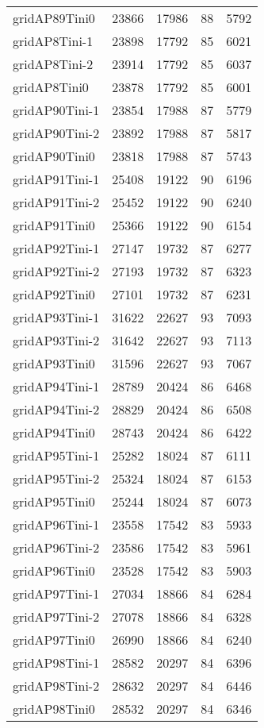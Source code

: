 \begin{tabular}{lrrrr}
gridAP89Tini0 & 23866 & 17986 & 88 & 5792 \\
gridAP8Tini-1 & 23898 & 17792 & 85 & 6021 \\
gridAP8Tini-2 & 23914 & 17792 & 85 & 6037 \\
gridAP8Tini0 & 23878 & 17792 & 85 & 6001 \\
gridAP90Tini-1 & 23854 & 17988 & 87 & 5779 \\
gridAP90Tini-2 & 23892 & 17988 & 87 & 5817 \\
gridAP90Tini0 & 23818 & 17988 & 87 & 5743 \\
gridAP91Tini-1 & 25408 & 19122 & 90 & 6196 \\
gridAP91Tini-2 & 25452 & 19122 & 90 & 6240 \\
gridAP91Tini0 & 25366 & 19122 & 90 & 6154 \\
gridAP92Tini-1 & 27147 & 19732 & 87 & 6277 \\
gridAP92Tini-2 & 27193 & 19732 & 87 & 6323 \\
gridAP92Tini0 & 27101 & 19732 & 87 & 6231 \\
gridAP93Tini-1 & 31622 & 22627 & 93 & 7093 \\
gridAP93Tini-2 & 31642 & 22627 & 93 & 7113 \\
gridAP93Tini0 & 31596 & 22627 & 93 & 7067 \\
gridAP94Tini-1 & 28789 & 20424 & 86 & 6468 \\
gridAP94Tini-2 & 28829 & 20424 & 86 & 6508 \\
gridAP94Tini0 & 28743 & 20424 & 86 & 6422 \\
gridAP95Tini-1 & 25282 & 18024 & 87 & 6111 \\
gridAP95Tini-2 & 25324 & 18024 & 87 & 6153 \\
gridAP95Tini0 & 25244 & 18024 & 87 & 6073 \\
gridAP96Tini-1 & 23558 & 17542 & 83 & 5933 \\
gridAP96Tini-2 & 23586 & 17542 & 83 & 5961 \\
gridAP96Tini0 & 23528 & 17542 & 83 & 5903 \\
gridAP97Tini-1 & 27034 & 18866 & 84 & 6284 \\
gridAP97Tini-2 & 27078 & 18866 & 84 & 6328 \\
gridAP97Tini0 & 26990 & 18866 & 84 & 6240 \\
gridAP98Tini-1 & 28582 & 20297 & 84 & 6396 \\
gridAP98Tini-2 & 28632 & 20297 & 84 & 6446 \\
gridAP98Tini0 & 28532 & 20297 & 84 & 6346 \\

\end{tabular}
